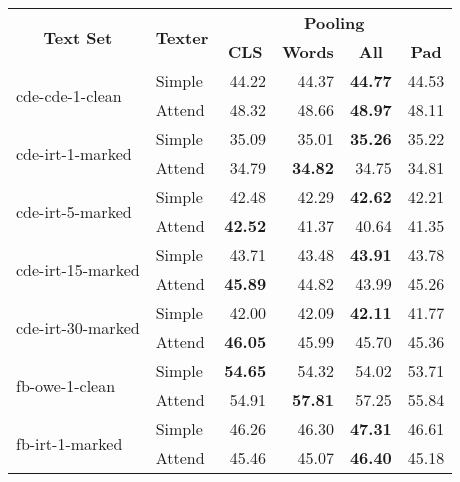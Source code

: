 \begin{tabular}{| l | l | r | r | r | r |}
    \hline

    \multicolumn{1}{|c|}{\multirow{2}{*}{\textbf{Text Set}}} &
    \multicolumn{1}{|c|}{\multirow{2}{*}{\textbf{Texter}}} &
    \multicolumn{4}{|c|}{\textbf{Pooling}} \\

    &
    &
    \multicolumn{1}{|c|}{\textbf{CLS}} &
    \multicolumn{1}{|c|}{\textbf{Words}} &
    \multicolumn{1}{|c|}{\textbf{All}} &
    \multicolumn{1}{|c|}{\textbf{Pad}} \\

    \hline \hline

    \multirow{2}{*}{cde-cde-1-clean}
    & Simple & 44.22 & 44.37 & \textbf{44.77} & 44.53 \\
    & Attend & 48.32 & 48.66 & \textbf{48.97} & 48.11 \\ \hline

    \multirow{2}{*}{cde-irt-1-marked}
    & Simple & 35.09 & 35.01 & \textbf{35.26} & 35.22 \\
    & Attend & 34.79 & \textbf{34.82} & 34.75 & 34.81 \\ \hline

    \multirow{2}{*}{cde-irt-5-marked}
    & Simple & 42.48 & 42.29 & \textbf{42.62} & 42.21 \\
    & Attend & \textbf{42.52} & 41.37 & 40.64 & 41.35 \\ \hline

    \multirow{2}{*}{cde-irt-15-marked}
    & Simple & 43.71 & 43.48 & \textbf{43.91} & 43.78 \\
    & Attend & \textbf{45.89} & 44.82 & 43.99 & 45.26 \\ \hline

    \multirow{2}{*}{cde-irt-30-marked}
    & Simple & 42.00 & 42.09 & \textbf{42.11} & 41.77 \\
    & Attend & \textbf{46.05} & 45.99 & 45.70 & 45.36 \\ \hline \hline

    \multirow{2}{*}{fb-owe-1-clean}
    & Simple & \textbf{54.65} & 54.32 & 54.02 & 53.71 \\
    & Attend & 54.91 & \textbf{57.81} & 57.25 & 55.84 \\ \hline

    \multirow{2}{*}{fb-irt-1-marked}
    & Simple & 46.26 & 46.30 & \textbf{47.31} & 46.61 \\
    & Attend & 45.46 & 45.07 & \textbf{46.40} & 45.18 \\ \hline


\end{tabular}
